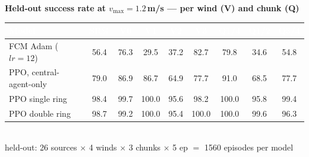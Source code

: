 \documentclass[12pt]{article}
\begin{document}
\centering
{\bfseries\large Held-out success rate at $v_{\max}=1.2$\,m/s --- per wind (V) and chunk (Q)}\\[10pt]
\begin{tabular}{l c c c c c c c c}
\toprule
\rowcolor{headerbg}
\textcolor{white}{\textbf{Model}} &
\textcolor{white}{\textbf{SR\%}} &
\textcolor{white}{\textbf{V0}} & \textcolor{white}{\textbf{V1}} &
\textcolor{white}{\textbf{V2}} & \textcolor{white}{\textbf{V3}} &
\textcolor{white}{\textbf{Q1/4}} & \textcolor{white}{\textbf{Q1/2}} & \textcolor{white}{\textbf{Q3/4}} \\
\midrule
FCM Adam ($lr{=}12$)   & 56.4 & 76.3 & 29.5 & 37.2 & 82.7 & 79.8 & 34.6 & 54.8 \\
\rowcolor{rowalt}
PPO, central-agent-only & 79.0 & 86.9 & 86.7 & 64.9 & 77.7 & 91.0 & 68.5 & 77.7 \\
PPO single ring        & 98.4 & 99.7 & 100.0 & 95.6 & 98.2 & 100.0 & 95.8 & 99.4 \\
\rowcolor{rowalt}
PPO double ring        & 98.7 & 99.2 & 100.0 & 95.4 & 100.0 & 100.0 & 99.6 & 96.3 \\
\bottomrule
\end{tabular}\\[8pt]
{\small held-out: 26 sources $\times$ 4 winds $\times$ 3 chunks $\times$ 5 ep $=$ 1560 episodes per model}
\end{document}
